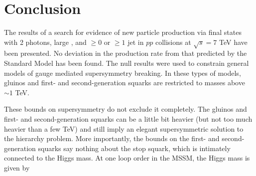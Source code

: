 \documentclass[dissertation.tex]{subfiles}
\begin{document}
\chapter{Conclusion}
\label{chap:Conclusion}

The results of a search for evidence of new particle production via final states with 2 photons, large \MET, and $\geq0$ or $\geq1$ jet in $pp$ collisions at $\sqrt{s} = 7$ TeV have been presented.  No deviation in the production rate from that predicted by the Standard Model has been found.  The null results were used to constrain general models of gauge mediated supersymmetry breaking.  In these types of models, gluinos and first- and second-generation squarks are restricted to masses above $\sim1$ TeV.

These bounds on supersymmetry do not exclude it completely.  The gluinos and first- and second-generation squarks can be a little bit heavier (but not too much heavier than a few TeV) and still imply an elegant supersymmetric solution to the hierarchy problem.  More importantly, the bounds on the first- and second-generation squarks say nothing about the stop squark, which is intimately connected to the Higgs mass.  At one loop order in the MSSM, the Higgs mass is given by

\end{document}
